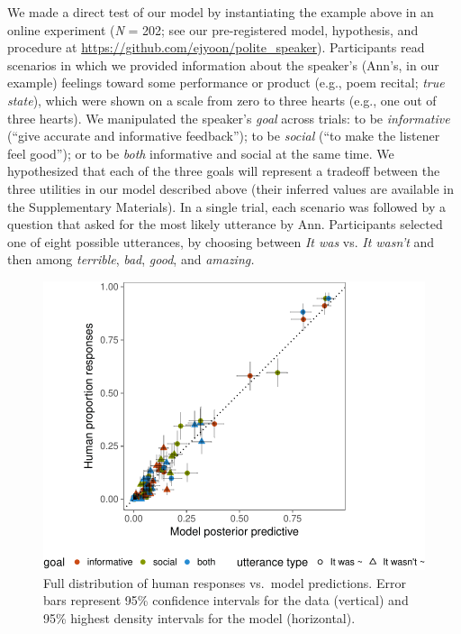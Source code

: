 \documentclass[12pt]{article}
\begin{document}
We made a direct test of our model by instantiating the example above in
an online experiment (\emph{N} = 202; see our pre-registered model,
hypothesis, and procedure at
\url{https://github.com/ejyoon/polite_speaker}). Participants read
scenarios in which we provided information about the speaker's (Ann's,
in our example) feelings toward some performance or product (e.g., poem
recital; \emph{true state}), which were shown on a scale from zero to
three hearts (e.g., one out of three hearts). We manipulated the
speaker's \emph{goal} across trials: to be \emph{informative}
(\enquote{give accurate and informative feedback}); to be \emph{social}
(\enquote{to make the listener feel good}); or to be \emph{both}
informative and social at the same time. We hypothesized that each of
the three goals will represent a tradeoff between the three utilities in
our model described above (their inferred values are available in the
Supplementary Materials). In a single trial, each scenario was followed
by a question that asked for the most likely utterance by Ann.
Participants selected one of eight possible utterances, by choosing
between \emph{It was} vs. \emph{It wasn't} and then among
\emph{terrible}, \emph{bad}, \emph{good}, and \emph{amazing.}


\begin{figure}
\centering
\includegraphics{polite_manuscript_files/figure-latex/variance-1.pdf}
\caption{\label{fig:variance}Full distribution of human responses vs.~model
predictions. Error bars represent 95\% confidence intervals for the data
(vertical) and 95\% highest density intervals for the model
(horizontal).}
\end{figure}
\end{document}
